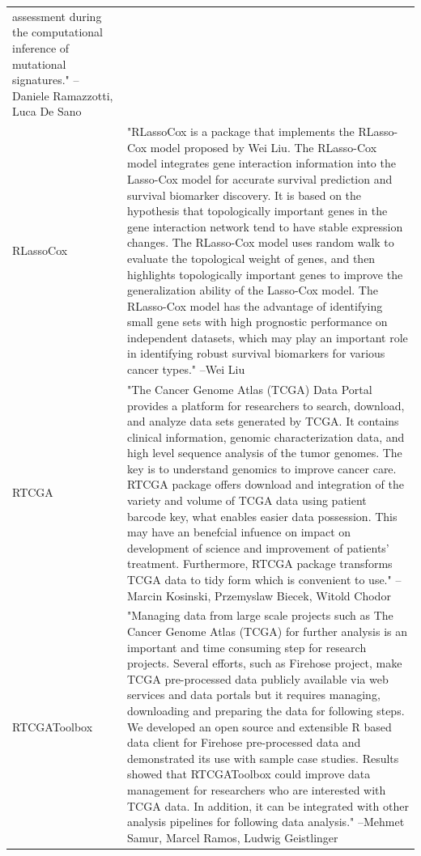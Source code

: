 \documentclass[]{article}
\begin{document}
\begin{longtable}[t]{l>{\raggedright\arraybackslash}p{25em}}
assessment during the computational inference of mutational
signatures." --Daniele Ramazzotti, Luca De Sano\\
RLassoCox & "RLassoCox is a package that implements the RLasso-Cox
model proposed by Wei Liu. The RLasso-Cox model integrates gene
interaction information into the Lasso-Cox model for accurate
survival prediction and survival biomarker discovery. It is
based on the hypothesis that topologically important genes in
the gene interaction network tend to have stable expression
changes. The RLasso-Cox model uses random walk to evaluate the
topological weight of genes, and then highlights topologically
important genes to improve the generalization ability of the
Lasso-Cox model. The RLasso-Cox model has the advantage of
identifying small gene sets with high prognostic performance on
independent datasets, which may play an important role in
identifying robust survival biomarkers for various cancer
types." --Wei Liu\\
\addlinespace
RTCGA & "The Cancer Genome Atlas (TCGA) Data Portal provides a
platform for researchers to search, download, and analyze data
sets generated by TCGA. It contains clinical information,
genomic characterization data, and high level sequence analysis
of the tumor genomes. The key is to understand genomics to
improve cancer care. RTCGA package offers download and
integration of the variety and volume of TCGA data using
patient barcode key, what enables easier data possession. This
may have an benefcial infuence on impact on development of
science and improvement of patients' treatment. Furthermore,
RTCGA package transforms TCGA data to tidy form which is
convenient to use." --Marcin Kosinski, Przemyslaw Biecek, Witold Chodor\\
RTCGAToolbox & "Managing data from large scale projects such as The Cancer
Genome Atlas (TCGA) for further analysis is an important and
time consuming step for research projects. Several efforts,
such as Firehose project, make TCGA pre-processed data publicly
available via web services and data portals but it requires
managing, downloading and preparing the data for following
steps. We developed an open source and extensible R based data
client for Firehose pre-processed data and demonstrated its use
with sample case studies. Results showed that RTCGAToolbox
could improve data management for researchers who are
interested with TCGA data. In addition, it can be integrated
with other analysis pipelines for following data analysis." --Mehmet Samur, Marcel Ramos, Ludwig Geistlinger\\

\end{longtable}
\end{document}

